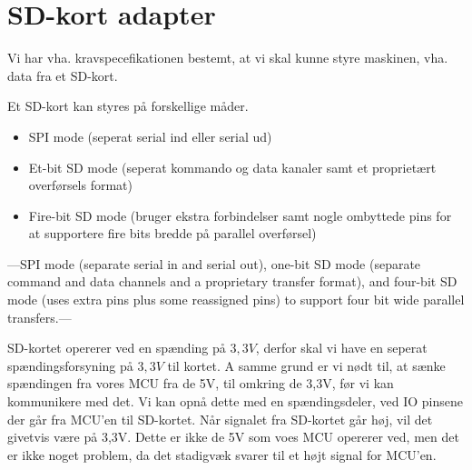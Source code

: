 

\section{SD-kort adapter}
Vi har vha. kravspecefikationen bestemt, at vi skal kunne styre
maskinen, vha. data fra et SD-kort.

Et SD-kort kan styres på forskellige måder. 

\begin{itemize}
\item{SPI mode (seperat serial ind eller serial ud)}
\item{Et-bit SD mode (seperat kommando og data kanaler samt et
    proprietært overførsels format)}
\item{Fire-bit SD mode (bruger ekstra forbindelser samt nogle
    ombyttede pins for at supportere fire bits bredde på parallel
    overførsel)}
\end{itemize}

---SPI mode (separate serial in and serial out), one-bit SD mode
(separate command and data channels and a proprietary transfer
format), and four-bit SD mode (uses extra pins plus some reassigned
pins) to support four bit wide parallel transfers.---


SD-kortet opererer ved en spænding på $3,3V$, derfor skal vi have en
seperat spændingsforsyning på $3,3V$ til kortet. A samme grund er vi
nødt til, at sænke spændingen fra vores MCU fra de 5V, til omkring de
3,3V, før vi kan kommunikere med det. Vi kan opnå dette med en
spændingsdeler, ved IO pinsene der går fra MCU'en til SD-kortet. Når
signalet fra SD-kortet går høj, vil det givetvis være på 3,3V. Dette
er ikke de 5V som voes MCU opererer ved, men det er ikke noget
problem, da det stadigvæk svarer til et højt signal for MCU'en.

